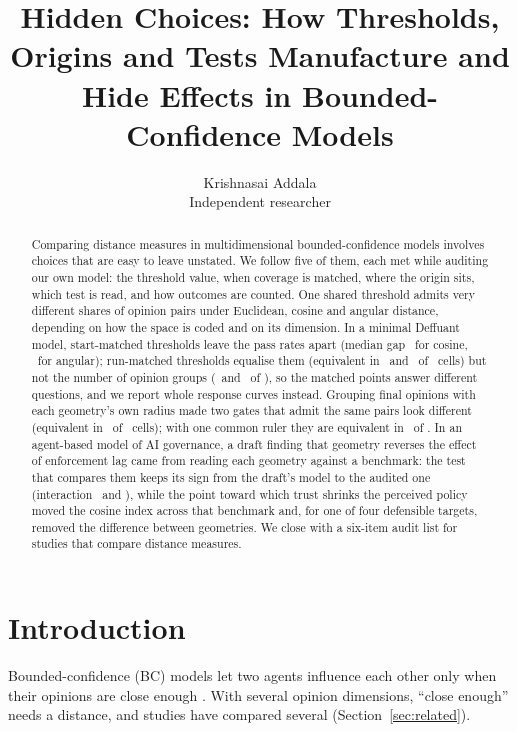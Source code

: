 \documentclass[11pt]{article}
\title{Hidden Choices: How Thresholds, Origins and Tests Manufacture and Hide Effects in Bounded-Confidence Models}
\author{Krishnasai Addala\\ \small Independent researcher}
\date{}
\begin{document}
\maketitle

\begin{abstract}
Comparing distance measures in multidimensional bounded-confidence models involves choices that are easy to leave unstated.
We follow five of them, each met while auditing our own model: the threshold value, when coverage is matched, where the origin sits, which test is read, and how outcomes are counted.
One shared threshold admits very different shares of opinion pairs under Euclidean, cosine and angular distance, depending on how the space is coded and on its dimension.
In a minimal Deffuant model, start-matched thresholds leave the pass rates apart (median gap \VTzeroPassGapCos\ for cosine, \VTzeroPassGapAng\ for angular); run-matched thresholds equalise them (equivalent in \VRunPassEquivCos\ and \VRunPassEquivAng\ of \VCellsPerGeom\ cells) but not the number of opinion groups (\VRunGroupEquivCos\ and \VRunGroupEquivAng\ of \VCellsPerGeom), so the matched points answer different questions, and we report whole response curves instead.
Grouping final opinions with each geometry's own radius made two gates that admit the same pairs look different (equivalent in \VCosAngOwnEquiv\ of \VCosAngCells\ cells); with one common ruler they are equivalent in \VCosAngCommonEquiv\ of \VCosAngCells.
In an agent-based model of AI governance, a draft finding that geometry reverses the effect of enforcement lag came from reading each geometry against a benchmark: the test that compares them keeps its sign from the draft's model to the audited one (interaction \VCDraftInter\ and \VCRecommendedInter), while the point toward which trust shrinks the perceived policy moved the cosine index across that benchmark and, for one of four defensible targets, removed the difference between geometries.
We close with a six-item audit list for studies that compare distance measures.
\end{abstract}

\section{Introduction}

Bounded-confidence (BC) models let two agents influence each other only when their opinions are close enough \citep{deffuant2000,hegselmann2002}.
With several opinion dimensions, ``close enough'' needs a distance, and studies have compared several (Section~\ref{sec:related}).
\end{document}
